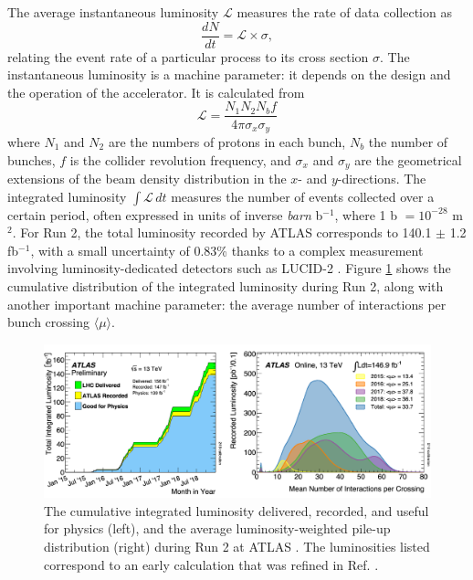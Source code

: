 The average instantaneous luminosity $\mathcal{L}$ measures the rate of data collection as
\begin{equation}
  \frac{dN}{dt} = \mathcal{L} \times \sigma,
\end{equation}
relating the event rate of a particular process to its cross section $\sigma$. The instantaneous luminosity is a machine parameter: it depends on the design and the operation of the accelerator. It is calculated from
\begin{equation}
  \mathcal{L} = \frac{N_1N_2N_bf}{4\pi\sigma_x\sigma_y}
\end{equation}
where $N_1$ and $N_2$ are the numbers of protons in each bunch, $N_b$ the number of bunches, $f$ is the collider revolution frequency, and $\sigma_x$ and $\sigma_y$ are the geometrical extensions of the beam density distribution in the $x$- and $y$-directions. The integrated luminosity $\int \mathcal{L}\, dt$ measures the number of events collected over a certain period, often expressed in units of inverse \textit{barn} b$^{-1}$, where 1 b $= 10^{-28}$ m$^{2}$. For Run 2, the total luminosity recorded by ATLAS corresponds to 140.1 $\pm$ 1.2 fb$^{-1}$, with a small uncertainty of 0.83\% \cite{ATLAS:2022hro} thanks to a complex measurement involving luminosity-dedicated detectors such as LUCID-2 \cite{Avoni_2018}. Figure \ref{fig-atlasLumiPileup} shows the cumulative distribution of the integrated luminosity during Run 2, along with another important machine parameter: the average number of interactions per bunch crossing $\langle \mu\rangle$.

\begin{figure}[!h]
  \centering
  \includegraphics[width=\textwidth]{Images/ATLAS/recoATLAS.png}
  \caption{The cumulative integrated luminosity delivered, recorded, and useful for physics (left), and the average luminosity-weighted pile-up distribution (right) during Run 2 at ATLAS \cite{PubAtlasLumi}. The luminosities listed correspond to an early calculation that was refined in Ref. \cite{ATLAS:2022hro}.}
  \label{fig-atlasLumiPileup}
\end{figure}

